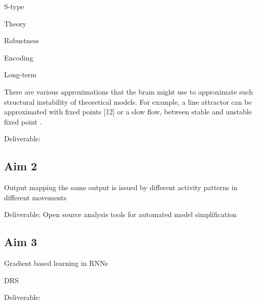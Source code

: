 \documentclass[12pt,letterpaper, onecolumn]{article}
\theoremstyle{definition}
\theoremstyle{remark}
\begin{document}
S-type \citep{panichello2019, burak2012}

Theory \citep{beer1995ctrnn, beer1995interaction, beer1995computational, beer2006, beer2023, jaeger2021, jaeger2023theory}
\citep{levenstein2023}


Robustness 
\citep{mastrogiuseppe2019}



Encoding \citep{goudar2018}

Long-term
\citep{soo2023}




There are various approximations that the brain might use to approximate such structural instability of theoretical models. For example, a line attractor can be approximated with fixed points [12] or a slow flow, between stable and unstable fixed point \citep{haviv2019, pollock2020}.


Deliverable:  

\subsection*{Aim 2}



Output mapping 
the same output is issued by different activity patterns in different movements \citep{athalye2021}



Deliverable:  Open source analysis tools for automated model simplification


\subsection*{Aim 3}

Gradient based learning in RNNs \citep{farrell2022}


DRS \citep{schmidt2019}


Deliverable:  

\newpage
\printbibliography
\end{document}
